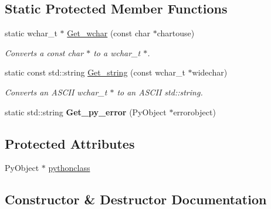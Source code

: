 \subsection*{Static Protected Member Functions}
\begin{DoxyCompactItemize}
\item 
static wchar\+\_\+t $\ast$ \hyperlink{classjetfuel_1_1inspire_1_1Python__module__loader_ad4fb50f7f68749decfeef1204fe06acb}{Get\+\_\+wchar} (const char $\ast$chartouse)
\begin{DoxyCompactList}\small\item\em Converts a const char $\ast$ to a wchar\+\_\+t $\ast$. \end{DoxyCompactList}\item 
static const std\+::string \hyperlink{classjetfuel_1_1inspire_1_1Python__module__loader_a88da3316adbe919080ad1c92045b4ad3}{Get\+\_\+string} (const wchar\+\_\+t $\ast$widechar)
\begin{DoxyCompactList}\small\item\em Converts an A\+S\+C\+II wchar\+\_\+t $\ast$ to an A\+S\+C\+II std\+::string. \end{DoxyCompactList}\item 
\mbox{\label{classjetfuel_1_1inspire_1_1Python__module__loader_adb872547c2aec3b27e5845fedb7a3f42}} 
static std\+::string {\bfseries Get\+\_\+py\+\_\+error} (Py\+Object $\ast$errorobject)
\end{DoxyCompactItemize}
\subsection*{Protected Attributes}
\begin{DoxyCompactItemize}
\item 
Py\+Object $\ast$ \hyperlink{classjetfuel_1_1inspire_1_1Python__module__loader_a973a8f86d446820b38b18f87fe51465a}{pythonclass}
\end{DoxyCompactItemize}


\subsection{Constructor \& Destructor Documentation}
\mbox{\label{classjetfuel_1_1inspire_1_1Python__module__loader_a30ab85906d5365ca34ca47b456460353}} 

